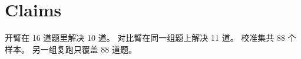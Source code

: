 \section{Claims}
\label{sec:claims}

开臂在 16 道题里解决 10 道。
对比臂在同一组题上解决 11 道。
校准集共 88 个样本。
另一组复跑只覆盖 88 道题。
